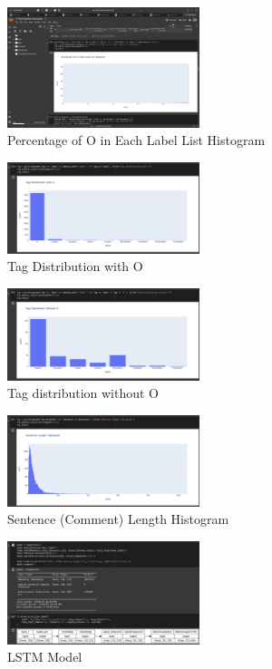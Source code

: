 \documentclass{solutionclass} %
\begin{document}
\begin{figure}[h!]
    \caption{Percentage of O in Each Label List Histogram}
    \centering
    \includegraphics[width=0.5\textwidth]{img/1/1.png}
\end{figure}

\begin{figure}[h!]
    \caption{ Tag Distribution with O}
    \centering
    \includegraphics[width=0.5\textwidth]{img/1/2.png}
\end{figure}


\begin{figure}[h!]
    \caption{Tag distribution without O}
    \centering
    \includegraphics[width=0.5\textwidth]{img/1/3.png}
\end{figure}

\begin{figure}[h!]
    \caption{Sentence (Comment) Length Histogram}
    \centering
    \includegraphics[width=0.5\textwidth]{img/1/4.png}
\end{figure}

\begin{figure}[h!]
    \caption{LSTM Model}
    \centering
    \includegraphics[width=0.5\textwidth]{img/1/5.png}
\end{figure}
\end{document}
